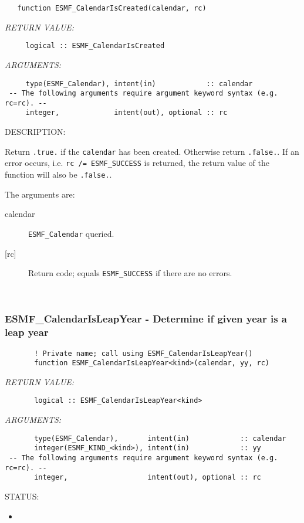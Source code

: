 
\begin{verbatim}   function ESMF_CalendarIsCreated(calendar, rc)\end{verbatim}{\em RETURN VALUE:}
\begin{verbatim}     logical :: ESMF_CalendarIsCreated\end{verbatim}{\em ARGUMENTS:}
\begin{verbatim}     type(ESMF_Calendar), intent(in)            :: calendar
 -- The following arguments require argument keyword syntax (e.g. rc=rc). --
     integer,             intent(out), optional :: rc
 \end{verbatim}
{\sf DESCRIPTION:\\ }


     Return {\tt .true.} if the {\tt calendar} has been created. Otherwise return 
     {\tt .false.}. If an error occurs, i.e. {\tt rc /= ESMF\_SUCCESS} is 
     returned, the return value of the function will also be {\tt .false.}.
  
   The arguments are:
     \begin{description}
     \item[calendar]
       {\tt ESMF\_Calendar} queried.
     \item[{[rc]}]
       Return code; equals {\tt ESMF\_SUCCESS} if there are no errors.
     \end{description}
   
 
\mbox{}\hrulefill\ 
 
\subsubsection [ESMF\_CalendarIsLeapYear] {ESMF\_CalendarIsLeapYear - Determine if given year is a leap year}


  
\begin{verbatim}       ! Private name; call using ESMF_CalendarIsLeapYear()
       function ESMF_CalendarIsLeapYear<kind>(calendar, yy, rc)\end{verbatim}{\em RETURN VALUE:}
\begin{verbatim}       logical :: ESMF_CalendarIsLeapYear<kind>\end{verbatim}{\em ARGUMENTS:}
\begin{verbatim}       type(ESMF_Calendar),       intent(in)            :: calendar
       integer(ESMF_KIND_<kind>), intent(in)            :: yy
 -- The following arguments require argument keyword syntax (e.g. rc=rc). --
       integer,                   intent(out), optional :: rc\end{verbatim}
{\sf STATUS:}
   \begin{itemize}
   \item{}
   \end{itemize}
  
